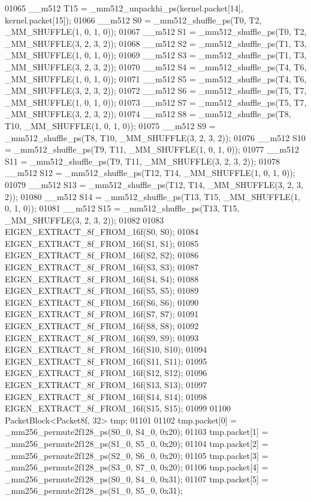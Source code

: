 \begin{DoxyCode}
01065   \_\_m512 T15 = \_mm512\_unpackhi\_ps(kernel.packet[14], kernel.packet[15]);
01066   \_\_m512 S0 = \_mm512\_shuffle\_ps(T0, T2, \_MM\_SHUFFLE(1, 0, 1, 0));
01067   \_\_m512 S1 = \_mm512\_shuffle\_ps(T0, T2, \_MM\_SHUFFLE(3, 2, 3, 2));
01068   \_\_m512 S2 = \_mm512\_shuffle\_ps(T1, T3, \_MM\_SHUFFLE(1, 0, 1, 0));
01069   \_\_m512 S3 = \_mm512\_shuffle\_ps(T1, T3, \_MM\_SHUFFLE(3, 2, 3, 2));
01070   \_\_m512 S4 = \_mm512\_shuffle\_ps(T4, T6, \_MM\_SHUFFLE(1, 0, 1, 0));
01071   \_\_m512 S5 = \_mm512\_shuffle\_ps(T4, T6, \_MM\_SHUFFLE(3, 2, 3, 2));
01072   \_\_m512 S6 = \_mm512\_shuffle\_ps(T5, T7, \_MM\_SHUFFLE(1, 0, 1, 0));
01073   \_\_m512 S7 = \_mm512\_shuffle\_ps(T5, T7, \_MM\_SHUFFLE(3, 2, 3, 2));
01074   \_\_m512 S8 = \_mm512\_shuffle\_ps(T8, T10, \_MM\_SHUFFLE(1, 0, 1, 0));
01075   \_\_m512 S9 = \_mm512\_shuffle\_ps(T8, T10, \_MM\_SHUFFLE(3, 2, 3, 2));
01076   \_\_m512 S10 = \_mm512\_shuffle\_ps(T9, T11, \_MM\_SHUFFLE(1, 0, 1, 0));
01077   \_\_m512 S11 = \_mm512\_shuffle\_ps(T9, T11, \_MM\_SHUFFLE(3, 2, 3, 2));
01078   \_\_m512 S12 = \_mm512\_shuffle\_ps(T12, T14, \_MM\_SHUFFLE(1, 0, 1, 0));
01079   \_\_m512 S13 = \_mm512\_shuffle\_ps(T12, T14, \_MM\_SHUFFLE(3, 2, 3, 2));
01080   \_\_m512 S14 = \_mm512\_shuffle\_ps(T13, T15, \_MM\_SHUFFLE(1, 0, 1, 0));
01081   \_\_m512 S15 = \_mm512\_shuffle\_ps(T13, T15, \_MM\_SHUFFLE(3, 2, 3, 2));
01082 
01083   EIGEN\_EXTRACT\_8f\_FROM\_16f(S0, S0);
01084   EIGEN\_EXTRACT\_8f\_FROM\_16f(S1, S1);
01085   EIGEN\_EXTRACT\_8f\_FROM\_16f(S2, S2);
01086   EIGEN\_EXTRACT\_8f\_FROM\_16f(S3, S3);
01087   EIGEN\_EXTRACT\_8f\_FROM\_16f(S4, S4);
01088   EIGEN\_EXTRACT\_8f\_FROM\_16f(S5, S5);
01089   EIGEN\_EXTRACT\_8f\_FROM\_16f(S6, S6);
01090   EIGEN\_EXTRACT\_8f\_FROM\_16f(S7, S7);
01091   EIGEN\_EXTRACT\_8f\_FROM\_16f(S8, S8);
01092   EIGEN\_EXTRACT\_8f\_FROM\_16f(S9, S9);
01093   EIGEN\_EXTRACT\_8f\_FROM\_16f(S10, S10);
01094   EIGEN\_EXTRACT\_8f\_FROM\_16f(S11, S11);
01095   EIGEN\_EXTRACT\_8f\_FROM\_16f(S12, S12);
01096   EIGEN\_EXTRACT\_8f\_FROM\_16f(S13, S13);
01097   EIGEN\_EXTRACT\_8f\_FROM\_16f(S14, S14);
01098   EIGEN\_EXTRACT\_8f\_FROM\_16f(S15, S15);
01099 
01100   PacketBlock<Packet8f, 32> tmp;
01101 
01102   tmp.packet[0] = \_mm256\_permute2f128\_ps(S0\_0, S4\_0, 0x20);
01103   tmp.packet[1] = \_mm256\_permute2f128\_ps(S1\_0, S5\_0, 0x20);
01104   tmp.packet[2] = \_mm256\_permute2f128\_ps(S2\_0, S6\_0, 0x20);
01105   tmp.packet[3] = \_mm256\_permute2f128\_ps(S3\_0, S7\_0, 0x20);
01106   tmp.packet[4] = \_mm256\_permute2f128\_ps(S0\_0, S4\_0, 0x31);
01107   tmp.packet[5] = \_mm256\_permute2f128\_ps(S1\_0, S5\_0, 0x31);

\end{DoxyCode}

